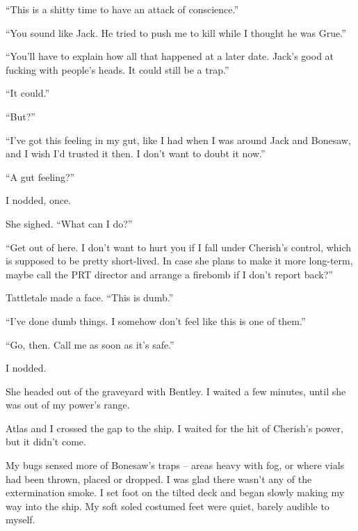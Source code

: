 ``This is a shitty time to have an attack of conscience.''



``You sound like Jack.  He tried to push me to kill while I thought he was Grue.''



``You'll have to explain how all that happened at a later date.  Jack's good at fucking with people's heads.  It could still be a trap.''



``It could.''



``But?''



``I've got this feeling in my gut, like I had when I was around Jack and Bonesaw, and I wish I'd trusted it then.  I don't want to doubt it now.''



``A gut feeling?''



I nodded, once.



She sighed.  ``What can I do?''



``Get out of here.  I don't want to hurt you if I fall under Cherish's control, which is supposed to be pretty short-lived.  In case she plans to make it more long-term, maybe call the PRT director and arrange a firebomb if I don't report back?''



Tattletale made a face.  ``This is dumb.''



``I've done dumb things.  I somehow don't feel like this is one of them.''



``Go, then.  Call me as soon as it's safe.''



I nodded.



She headed out of the graveyard with Bentley.  I waited a few minutes, until she was out of my power's range.



Atlas and I crossed the gap to the ship.  I waited for the hit of Cherish's power, but it didn't come.



My bugs sensed more of Bonesaw's traps – areas heavy with fog, or where vials had been thrown, placed or dropped.  I was glad there wasn't any of the extermination smoke.  I set foot on the tilted deck and began slowly making my way into the ship.  My soft soled costumed feet were quiet, barely audible to myself.



